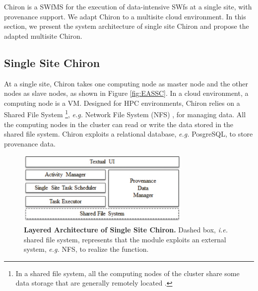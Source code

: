 Chiron \cite{Ogasawara2013} is a SWfMS for the execution of data-intensive SWfs at a single site, with provenance support. We adapt Chiron to a multisite cloud environment. In this section, we present the system architecture of single site Chiron and propose the adapted multisite Chiron. 

\subsection{Single Site Chiron}
\label{subsec:SSSA}

At a single site, Chiron takes one computing node as master node and the other nodes as slave nodes, as shown in Figure \ref{fig:EASSC}. In a cloud environment, a computing node is a VM. Designed for HPC environments, Chiron relies on a Shared File System \footnote{In a shared file system, all the computing nodes of the cluster share some data storage that are generally remotely located \cite{Liu2014a}.}, \textit{e.g.} Network File System (NFS) \cite{Sandberg1988}, for managing data. All the computing nodes in the cluster can read or write the data stored in the shared file system.
Chiron exploits a relational database, \textit{e.g.} PosgreSQL, to store provenance data.
 

\begin{figure}
\begin{centering}
\captionsetup{justification=centering}
\includegraphics[width=84mm]{figures/CA}
\par\end{centering}
\caption{\textbf{Layered Architecture of Single Site Chiron. } Dashed box, \textit{i.e.} shared file system, represents that the module exploits an external system, \textit{e.g.} NFS, to realize the function.}
\label{fig:CA}
\end{figure}


